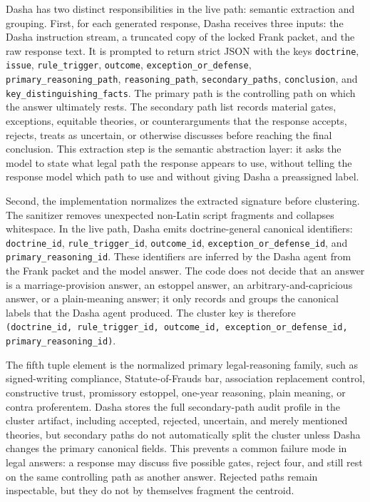 Dasha has two distinct responsibilities in the live path: semantic extraction
and grouping. First, for each generated response, Dasha receives three inputs:
the Dasha instruction stream, a truncated copy of the locked Frank packet, and
the raw response text. It is prompted to return strict JSON with the keys
\texttt{doctrine}, \texttt{issue}, \texttt{rule\_trigger}, \texttt{outcome},
\texttt{exception\_or\_defense}, \texttt{primary\_reasoning\_path},
\texttt{reasoning\_path}, \texttt{secondary\_paths}, \texttt{conclusion}, and
\texttt{key\_distinguishing\_facts}. The primary path is the controlling path
on which the answer ultimately rests. The secondary path list records material
gates, exceptions, equitable theories, or counterarguments that the response
accepts, rejects, treats as uncertain, or otherwise discusses before reaching
the final conclusion. This extraction step is the semantic abstraction layer:
it asks the model to state what legal path the response appears to use, without
telling the response model which path to use and without giving Dasha a
preassigned label.

Second, the implementation normalizes the extracted signature before clustering.
The sanitizer removes unexpected non-Latin script fragments and collapses
whitespace. In the live path, Dasha emits doctrine-general canonical identifiers:
\texttt{doctrine\_id}, \texttt{rule\_trigger\_id}, \texttt{outcome\_id},
\texttt{exception\_or\_defense\_id}, and \texttt{primary\_reasoning\_id}. These
identifiers are inferred by the Dasha agent from the Frank packet and the model
answer. The code does not decide that an answer is a marriage-provision answer,
an estoppel answer, an arbitrary-and-capricious answer, or a plain-meaning
answer; it only records and groups the canonical labels that the Dasha agent
produced. The cluster key is therefore
\texttt{(doctrine\_id, rule\_trigger\_id, outcome\_id,
exception\_or\_defense\_id, primary\_reasoning\_id)}.

The fifth tuple element is the normalized primary legal-reasoning family, such
as signed-writing compliance, Statute-of-Frauds bar, association replacement
control, constructive trust, promissory estoppel, one-year reasoning, plain
meaning, or contra proferentem. Dasha stores the full secondary-path audit
profile in the cluster artifact, including accepted, rejected, uncertain, and
merely mentioned theories, but secondary paths do not automatically split the
cluster unless Dasha changes the primary canonical fields. This
prevents a common failure mode in legal answers: a response may discuss five
possible gates, reject four, and still rest on the same controlling path as
another answer. Rejected paths remain inspectable, but they do not by themselves
fragment the centroid.

